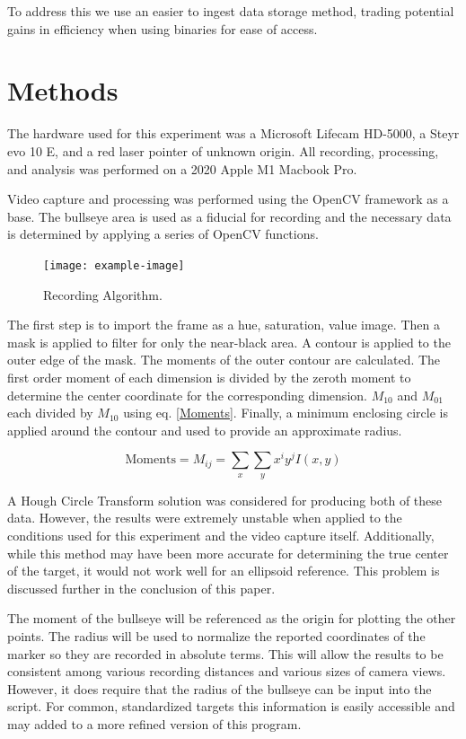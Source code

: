 \documentclass[conference]{IEEEtran}
\begin{document}
To address this we use an easier to ingest data storage method, trading potential gains in efficiency when using binaries for ease of access.

\section{Methods}

The hardware used for this experiment was 
a Microsoft Lifecam HD-5000,
a Steyr evo 10 E,
and a red laser pointer of unknown origin.
All recording, processing, and analysis was performed on 
a 2020 Apple M1 Macbook Pro.

Video capture and processing was performed using the 
OpenCV \cite{itseez2015opencv} framework as a base.
The bullseye area is used as a fiducial for recording and 
the necessary data is determined by applying a series of OpenCV functions.

\begin{figure}[]
	\centering
	\texttt{[image: example-image]}
	\caption{Recording Algorithm.}
	\label{fig:capture_algorithm}
\end{figure}

The first step is to import the frame as a hue, saturation, value image.
Then a mask is applied to filter for only the near-black area.
A contour is applied to the outer edge of the mask.
The moments of the outer contour are calculated.
The first order moment of each dimension is divided by the zeroth moment to determine the center coordinate for the corresponding dimension.
$M_{10}$ and $M_{01}$ each divided by $M_{10}$ using eq. \eqref{Moments}.
Finally, a minimum enclosing circle is applied around the contour and used to provide an approximate radius.

\begin{equation}\label{Moments}
	\text{Moments} = M_{ij} = \sum_{x} \sum_{y} x^i y^j I(x,y)
\end{equation}

A Hough Circle Transform solution \cite{Hough1964} was considered for producing both of these data.
However, the results were extremely unstable when applied to the conditions used for this experiment and the video capture itself.
Additionally, while this method may have been more accurate for determining the true center of the target, it would not work well for an ellipsoid reference.
This problem is discussed further in the conclusion of this paper.

The moment of the bullseye will be referenced as the origin for plotting the other points. 
The radius will be used to normalize the reported coordinates of the marker so they are recorded in absolute terms.
This will allow the results to be consistent among various recording distances and various sizes of camera views.
However, it does require that the radius of the bullseye can be input into the script.
For common, standardized targets this information is easily accessible
\cite{issfRules} and may added to a more refined version of this program.
\end{document}
